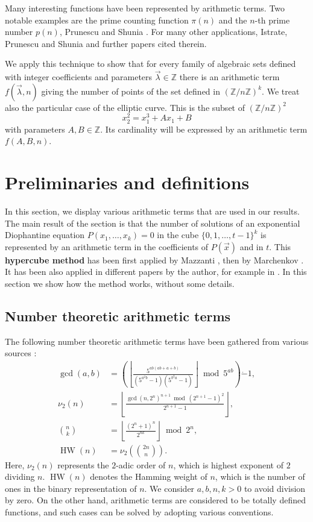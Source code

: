 \documentclass[10pt,a4paper]{article}
\theoremstyle{plain}
\newcommand{\floor}[1]{\left\lfloor #1 \right\rfloor}
\newcommand{\HW}{\operatorname{HW}}
\begin{document}
Many interesting functions have been represented by arithmetic terms. Two notable examples are the prime counting function $\pi(n)$ and the $n$-th prime number $p(n)$, Prunescu and Shunia \cite{prunescushuniaprimes}. For many other applications, Istrate, Prunescu and Shunia \cite{istrateprunescushuniauniversal} and further papers cited therein. 

We apply this technique to show that for every family of algebraic sets defined with integer coefficients and parameters $\vec \lambda \in \mathbb Z$ there is an arithmetic term $f(\vec \lambda, n)$ giving the number of points of the set defined in $(\mathbb Z / n \mathbb Z)^k$. We treat also the particular case of the elliptic curve. This is the subset of $(\mathbb Z / n \mathbb Z)^2$
$$x_2^2 = x_1^3 + Ax_1 + B$$
with parameters $A, B \in \mathbb Z$. Its cardinality will be expressed by an arithmetic term $f(A, B, n)$. 

\section{Preliminaries and definitions}\label{section2}
In this section, we display various arithmetic terms that are used in our results. The main result of the section is that the number of solutions of an exponential Diophantine equation $P(x_1, \dots, x_k) = 0$ in the cube $\{0, 1, \dots, t-1\}^k$ is represented by an arithmetic term in the coefficients of $P(\vec x)$ and in $t$. This {\bf hypercube method} has been first applied by Mazzanti \cite{mazzanti2002plainbases}, then by Marchenkov \cite{marchenkov2007superposition}. It has been also applied in different papers by the author, for example in \cite{prunescu2024numbertheoreticfunctions}. In this section we show how the method works, without some details.

\subsection{Number theoretic arithmetic terms}
The following number theoretic arithmetic terms have been gathered from various sources \cite{robinson1952arithmetic, mazzanti2002plainbases, marchenkov2007superposition, prunescushuniagcd}:
\begin{align*}
\gcd(a,b) &= \left (\floor{\frac{5^{ab(ab + a+b)}}{(5^{a^2b}-1)(5^{b^2a}-1)}} \bmod 5^{ab} \right ) \dot{-} 1, \\
\nu_2(n) &= \floor{\frac{\gcd(n, 2^n)^{n+1} \bmod (2^{n+1}-1)^2}{2^{n+1}-1}} , \\
\binom{n}{k} &= \floor{\frac{(2^n+1)^n}{2^{nk}}} \bmod 2^n , \\
\HW(n) &= \nu_2 \left( \binom{2n}{n} \right).
\end{align*}
Here, $\nu_2(n)$ represents the $2$-adic order of $n$, which is highest exponent of $2$ dividing $n$. $\HW(n)$ denotes the Hamming weight of $n$, which is the number of ones in the binary representation of $n$. We consider $a, b, n, k > 0$ to avoid division by zero. On the other hand, arithmetic terms are considered to be totally defined functions, and such cases can be solved by adopting various conventions. 
\end{document}
